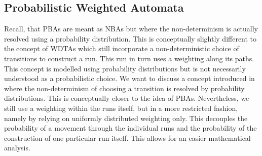 \subsection{Probabilistic Weighted Automata}
Recall, that \acp{PBA} are meant as \acp{NBA} but where the non-determinism is
actually resolved using a probability distribution. This is conceptually 
slightly different to the concept of \acp{WDTA} which still incorporate a 
non-deterministic choice of transitions to construct a run. This run in turn 
uses a weighting along its paths. This concept is modelled using probability 
distributions but is not necessarily understood as a probabilistic choice. We 
want to discuss a concept introduced in \cite[Chapter 4]{RandAutoInfTrees} 
where the non-determinism of choosing a transition is resolved by probability 
distributions. This is conceptually closer to the idea of \acp{PBA}. 
Nevertheless, we still use a weighting within the runs itself, but in a more 
restricted fashion, namely by relying on uniformly distributed weighting only. 
This decouples the probability of a movement through the individual runs and 
the probability of the construction of one particular run itself. This allows 
for an easier mathematical analysis.

